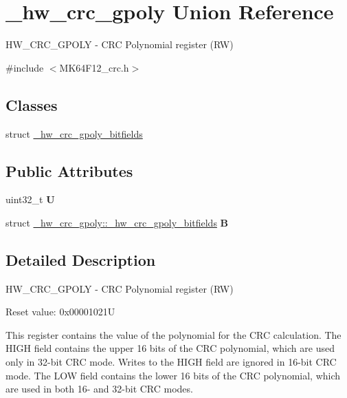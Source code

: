 \hypertarget{union__hw__crc__gpoly}{}\section{\+\_\+hw\+\_\+crc\+\_\+gpoly Union Reference}
\label{union__hw__crc__gpoly}


H\+W\+\_\+\+C\+R\+C\+\_\+\+G\+P\+O\+LY -\/ C\+RC Polynomial register (RW)  




{\ttfamily \#include $<$M\+K64\+F12\+\_\+crc.\+h$>$}

\subsection*{Classes}
\begin{DoxyCompactItemize}
\item 
struct \hyperlink{struct__hw__crc__gpoly_1_1__hw__crc__gpoly__bitfields}{\+\_\+hw\+\_\+crc\+\_\+gpoly\+\_\+bitfields}
\end{DoxyCompactItemize}
\subsection*{Public Attributes}
\begin{DoxyCompactItemize}
\item 
uint32\+\_\+t {\bfseries U}\hypertarget{union__hw__crc__gpoly_a845eb050c099e460b8e8935aa0042e31}{}\label{union__hw__crc__gpoly_a845eb050c099e460b8e8935aa0042e31}

\item 
struct \hyperlink{struct__hw__crc__gpoly_1_1__hw__crc__gpoly__bitfields}{\+\_\+hw\+\_\+crc\+\_\+gpoly\+::\+\_\+hw\+\_\+crc\+\_\+gpoly\+\_\+bitfields} {\bfseries B}\hypertarget{union__hw__crc__gpoly_a4a2a4f6af6698fb7c767f7f793e91919}{}\label{union__hw__crc__gpoly_a4a2a4f6af6698fb7c767f7f793e91919}

\end{DoxyCompactItemize}


\subsection{Detailed Description}
H\+W\+\_\+\+C\+R\+C\+\_\+\+G\+P\+O\+LY -\/ C\+RC Polynomial register (RW) 

Reset value\+: 0x00001021U

This register contains the value of the polynomial for the C\+RC calculation. The H\+I\+GH field contains the upper 16 bits of the C\+RC polynomial, which are used only in 32-\/bit C\+RC mode. Writes to the H\+I\+GH field are ignored in 16-\/bit C\+RC mode. The L\+OW field contains the lower 16 bits of the C\+RC polynomial, which are used in both 16-\/ and 32-\/bit C\+RC modes. 

